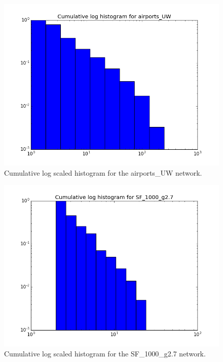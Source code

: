 \documentclass[12pt,a4paper,oneside]{article}
\numberwithin{equation}{section}
\numberwithin{equation}{section}
\theoremstyle{definition}
\begin{document}
\begin{figure}[h!]
	\centering
	\includegraphics[scale=0.5]{images/Cumu_log_airports_UW.png}
	\caption{Cumulative log scaled histogram for the airports\_UW network.}
	\label{airport}
\end{figure}

\begin{figure}[h!]
	\centering
	\includegraphics[scale=0.5]{images/Cumu_log_SF_1000_g2.png}
	\caption{Cumulative log scaled histogram for the SF\_1000\_g2.7 network.}
	\label{airport}
\end{figure}
\end{document}

